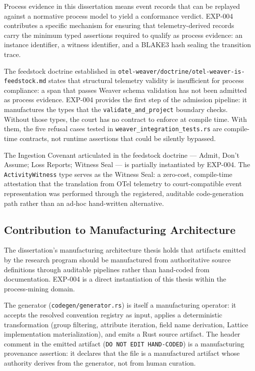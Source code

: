 Process evidence in this dissertation means event records that can be replayed against a
normative process model to yield a conformance verdict. EXP-004 contributes a specific
mechanism for ensuring that telemetry-derived records carry the minimum typed assertions
required to qualify as process evidence: an instance identifier, a witness identifier, and
a BLAKE3 hash sealing the transition trace.

The feedstock doctrine established in
\texttt{otel-weaver/doctrine/otel-weaver-is-feedstock.md} states that structural telemetry
validity is insufficient for process compliance: a span that passes Weaver schema
validation has not been admitted as process evidence. EXP-004 provides the first step of
the admission pipeline: it manufactures the types that the \texttt{validate\_and\_project}
boundary checks. Without those types, the court has no contract to enforce at compile
time. With them, the five refusal cases tested in \texttt{weaver\_integration\_tests.rs}
are compile-time contracts, not runtime assertions that could be silently bypassed.

The Ingestion Covenant articulated in the feedstock doctrine --- Admit, Don't Assume; Loss
Reports; Witness Seal --- is partially instantiated by EXP-004. The \texttt{ActivityWitness}
type serves as the Witness Seal: a zero-cost, compile-time attestation that the
translation from OTel telemetry to court-compatible event representation was performed
through the registered, auditable code-generation path rather than an ad-hoc hand-written
alternative.

\subsection{Contribution to Manufacturing Architecture}
\label{sec:otel-weaver-exp-004-registry-to-witness-manufacturing}

The dissertation's manufacturing architecture thesis holds that artifacts emitted by the
research program should be manufactured from authoritative source definitions through
auditable pipelines rather than hand-coded from documentation. EXP-004 is a direct
instantiation of this thesis within the process-mining domain.

The generator (\texttt{codegen/generator.rs}) is itself a manufacturing operator: it
accepts the resolved convention registry as input, applies a deterministic transformation
(group filtering, attribute iteration, field name derivation, Lattice implementation
materialization), and emits a Rust source artifact. The header comment in the emitted
artifact (\texttt{DO NOT EDIT HAND-CODED}) is a manufacturing provenance assertion: it
declares that the file is a manufactured artifact whose authority derives from the
generator, not from human curation.

